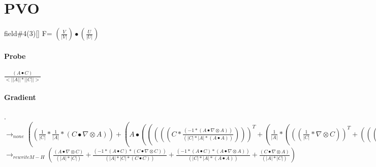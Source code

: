 \documentclass{article}
\begin{document}
\section{PVO}
field\#4(3)[] F= $(\frac{V}{|V|})\bullet(\frac{U}{|U|})$
\paragraph{Probe} $  \frac{(A \bullet C)}{<||A||*||C||>}$
\paragraph{Gradient}. 
 \\ \newline $\rightarrow_{none}
(( \frac{1}{|C|}* \frac{1}{|A|}*(C \bullet  \nabla  \otimes A))+(A \bullet (((((C* \frac{(-1*(A \bullet  \nabla  \otimes A))}{(|C|*|A|*(A \bullet A))})))^T+( \frac{1}{|A|}*((( \frac{1}{|C|}* \nabla  \otimes C))^T+(((C* \frac{(-1*(C \bullet  \nabla  \otimes C))}{((C \bullet C)*|C|)})))^T))))^T))$
 \\ \newline $\rightarrow_{rewriteM-H}( \frac{(A \bullet  \nabla  \otimes C)}{(|A|*|C|)}+ \frac{(-1*(A \bullet C)*(C \bullet  \nabla  \otimes C))}{(|A|*|C|*(C \bullet C))}+ \frac{(-1*(A \bullet C)*(A \bullet  \nabla  \otimes A))}{(|C|*|A|*(A \bullet A))}+ \frac{(C \bullet  \nabla  \otimes A)}{(|A|*|C|)})$
\end{document}
